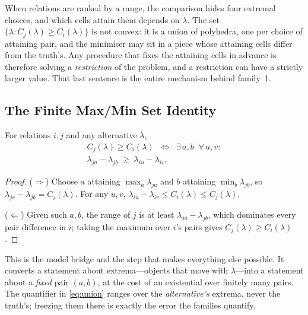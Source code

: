 When relations are ranked by a range, the comparison hides four extremal choices, and which
cells attain them depends on $\lambda$. The set $\{\lambda:C_{j}(\lambda)\ge C_{i}(\lambda)\}$
is not convex: it is a union of polyhedra, one per choice of attaining pair, and the
minimiser may sit in a piece whose attaining cells differ from the truth's. Any procedure
that fixes the attaining cells in advance is therefore solving a \emph{restriction} of the
problem, and a restriction can have a strictly larger value. That last sentence is the entire
mechanism behind family~1.

\subsection{The Finite Max/Min Set Identity}
\label{sec:union}

\begin{theorem}
\label{thm:union}
For relations $i,j$ and any alternative $\lambda$,
\begin{multline}
C_{j}(\lambda)\geq C_{i}(\lambda)
\;\;\Longleftrightarrow\;\;
\exists\,a,b\;\;\forall\,u,v:\\
\lambda_{ja}-\lambda_{jb}\;\geq\;\lambda_{iu}-\lambda_{iv}.
\label{eq:union}
\end{multline}
\end{theorem}

\begin{proof}
($\Rightarrow$) Choose $a$ attaining $\max_{a}\lambda_{ja}$ and $b$ attaining
$\min_{b}\lambda_{jb}$, so $\lambda_{ja}-\lambda_{jb}=C_{j}(\lambda)$. For any $u,v$,
$\lambda_{iu}-\lambda_{iv}\le C_{i}(\lambda)\le C_{j}(\lambda)$.

($\Leftarrow$) Given such $a,b$, the range of $j$ is at least $\lambda_{ja}-\lambda_{jb}$,
which dominates every pair difference in $i$; taking the maximum over $i$'s pairs gives
$C_{j}(\lambda)\ge C_{i}(\lambda)$.
\end{proof}


This is the model bridge and the step that makes everything else possible. It converts a
statement about extrema---objects that move with $\lambda$---into a statement about a
\emph{fixed} pair $(a,b)$, at the cost of an existential over finitely many pairs. The
quantifier in \eqref{eq:union} ranges over the \emph{alternative's} extrema, never the
truth's; freezing them there is exactly the error the families quantify.

